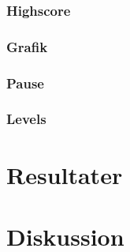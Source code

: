 \documentclass[a4paper,12pt]{article}
\begin{document}
\subsubsection{Highscore}
\subsubsection{Grafik}
\subsubsection{Pause}
\subsubsection{Levels}
\newpage
\section{Resultater}
\newpage
\section{Diskussion}
\newpage
\end{document}
